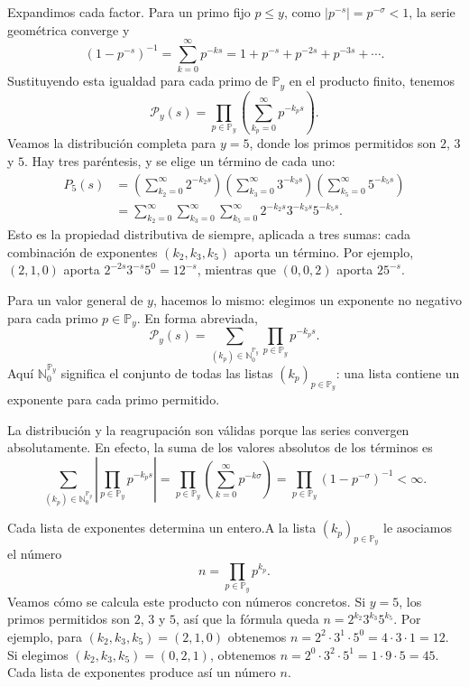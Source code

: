 \documentclass[11pt,a4paper]{article}
\begin{document}
Expandimos cada factor. Para un primo fijo $p\le y$, como
$|p^{-s}|=p^{-\sigma}<1$, la serie geométrica converge y
\[
  (1-p^{-s})^{-1}=\sum_{k=0}^{\infty}p^{-ks}
  =1+p^{-s}+p^{-2s}+p^{-3s}+\cdots.
\]
Sustituyendo esta igualdad para cada primo de $\mathbb{P}_y$ en el producto
finito, tenemos
\[
  \mathscr{P}_y(s)=\prod_{p\in\mathbb{P}_y}
          \left(\sum_{k_p=0}^{\infty}p^{-k_ps}\right).
\]
Veamos la distribución completa para $y=5$, donde los primos permitidos son
$2$, $3$ y $5$. Hay tres paréntesis, y se elige un término de cada uno:
\begin{align*}
 P_5(s)
 &=\left(\sum_{k_2=0}^{\infty}2^{-k_2s}\right)
   \left(\sum_{k_3=0}^{\infty}3^{-k_3s}\right)
   \left(\sum_{k_5=0}^{\infty}5^{-k_5s}\right)\\
 &=\sum_{k_2=0}^{\infty}\sum_{k_3=0}^{\infty}\sum_{k_5=0}^{\infty}
   2^{-k_2s}3^{-k_3s}5^{-k_5s}.
\end{align*}
Esto es la propiedad distributiva de siempre, aplicada a tres sumas: cada
combinación de exponentes $(k_2,k_3,k_5)$ aporta un término. Por ejemplo,
$(2,1,0)$ aporta $2^{-2s}3^{-s}5^0=12^{-s}$, mientras que $(0,0,2)$ aporta
$25^{-s}$.

Para un valor general de $y$, hacemos lo mismo: elegimos un exponente no
negativo para cada primo $p\in\mathbb{P}_y$. En forma abreviada,
\[
  \mathscr{P}_y(s)=\sum_{(k_p)\in\mathbb{N}_0^{\mathbb{P}_y}}
          \prod_{p\in\mathbb{P}_y}p^{-k_ps}.
\]
Aquí $\mathbb{N}_0^{\mathbb{P}_y}$ significa el conjunto de todas las listas
$(k_p)_{p\in\mathbb{P}_y}$: una lista contiene un exponente para cada primo
permitido.

La distribución y la reagrupación son válidas porque las series convergen
absolutamente. En efecto, la suma de los valores absolutos de los términos es
\[
  \sum_{(k_p)\in\mathbb{N}_0^{\mathbb{P}_y}}
     \left|\prod_{p\in\mathbb{P}_y}p^{-k_ps}\right|
  =\prod_{p\in\mathbb{P}_y}\left(\sum_{k=0}^{\infty}p^{-k\sigma}\right)
  =\prod_{p\in\mathbb{P}_y}(1-p^{-\sigma})^{-1}<\infty.
\]

Cada lista de exponentes determina un entero.A la lista
$(k_p)_{p\in\mathbb{P}_y}$ le asociamos el número
\[
  n=\prod_{p\in\mathbb{P}_y}p^{k_p}.
\]
Veamos cómo se calcula este producto con números concretos. Si $y=5$, los
primos permitidos son $2$, $3$ y $5$, así que la fórmula queda
$n=2^{k_2}3^{k_3}5^{k_5}$. Por ejemplo, para
$(k_2,k_3,k_5)=(2,1,0)$ obtenemos
$n=2^2\cdot3^1\cdot5^0=4\cdot3\cdot1=12$. Si elegimos
$(k_2,k_3,k_5)=(0,2,1)$, obtenemos
$n=2^0\cdot3^2\cdot5^1=1\cdot9\cdot5=45$. Cada lista de exponentes
produce así un número $n$.
\end{document}

